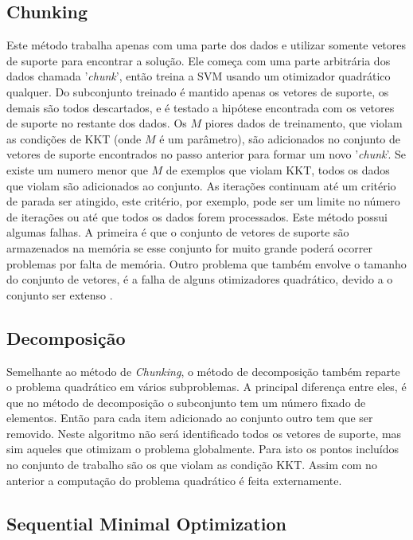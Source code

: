 \subsection{Chunking} \label{spqS1}

Este método trabalha apenas com uma parte dos dados e utilizar somente vetores de suporte para encontrar a solução. Ele começa com uma parte arbitrária dos dados chamada '\textit{chunk}', então treina a SVM usando um otimizador quadrático qualquer. Do subconjunto treinado é mantido apenas os vetores de suporte, os demais são todos descartados, e é testado a hipótese encontrada com os vetores de suporte no restante dos dados. Os $M$ piores dados de treinamento, que violam as condições de KKT (onde $M$ é um parâmetro), são adicionados no conjunto de vetores de suporte encontrados no passo anterior para formar um novo '\textit{chunk}'. Se existe um numero menor que $M$ de exemplos que violam KKT, todos os dados que violam são adicionados ao conjunto. As iterações continuam até um critério de parada ser atingido, este critério, por exemplo, pode ser um limite no número de iterações ou até que todos os dados forem processados. Este método possui algumas falhas. A primeira é que o conjunto de vetores de suporte são armazenados na memória se esse conjunto for muito grande poderá ocorrer problemas por falta de memória. Outro problema que também envolve o tamanho do conjunto de vetores, é a falha de alguns otimizadores quadrático, devido a o conjunto ser extenso \cite{Cristianini2000,Platt1999}.

\subsection{Decomposição} \label{spqS2}

Semelhante ao método de \textit{Chunking}, o método de decomposição também reparte o problema quadrático em vários subproblemas. A principal diferença entre eles, é que no método de decomposição o subconjunto tem um número fixado de elementos. Então para cada item adicionado ao conjunto outro tem que ser removido. Neste algoritmo não será identificado todos os vetores de suporte, mas sim aqueles que otimizam o problema globalmente. Para isto os pontos incluídos no conjunto de trabalho são os que violam as condição KKT. Assim com no anterior a computação do problema quadrático é feita externamente.

\subsection{Sequential Minimal Optimization} \label{spqS3}

